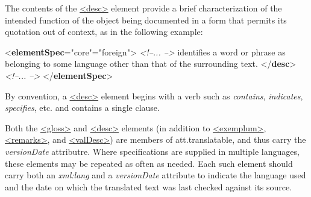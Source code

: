 The contents of the \hyperref[TEI.desc]{<desc>} element provide a brief characterization of the intended function of the object being documented in a form that permits its quotation out of context, as in the following example: \par\bgroup{}\exampleFont \begin{shaded}\noindent\mbox{}{<\textbf{elementSpec}\hspace*{1em}{module}="{core}"\hspace*{1em}{ident}="{foreign}">}\mbox{}\newline 
\textit{<!--... -->}\mbox{}\newline 
{}identifies a word or phrase as belonging to some\mbox{}\newline 
\hspace*{1em}\hspace*{1em} language other than that of the surrounding text. {</\textbf{desc}>}\mbox{}\newline 
\textit{<!--... -->}\mbox{}\newline 
{</\textbf{elementSpec}>}\end{shaded}\egroup\par \noindent  By convention, a \hyperref[TEI.desc]{<desc>} element begins with a verb such as \textit{contains}, \textit{indicates}, \textit{specifies}, etc. and contains a single clause.\par
Both the \hyperref[TEI.gloss]{<gloss>} and \hyperref[TEI.desc]{<desc>} elements (in addition to \hyperref[TEI.exemplum]{<exemplum>}, \hyperref[TEI.remarks]{<remarks>}, and \hyperref[TEI.valDesc]{<valDesc>}) are members of \textsf{att.translatable}, and thus carry the {\itshape versionDate} attributre. Where specifications are supplied in multiple languages, these elements may be repeated as often as needed. Each such element should carry both an {\itshape xml:lang} and a {\itshape versionDate} attribute to indicate the language used and the date on which the translated text was last checked against its source.\par
